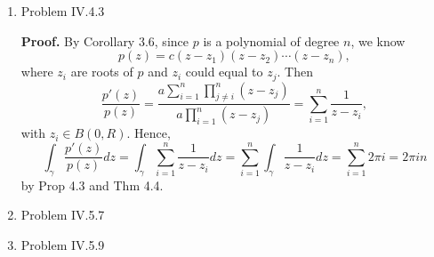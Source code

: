 \documentclass{article}%
\begin{document}
\begin{enumerate}
\item Problem IV.4.3

\textbf{Proof.} By Corollary 3.6, since $p$ is a polynomial of degree $n$, we know
$$
p(z) = c(z-z_1)(z-z_2)\cdots(z-z_n),
$$
where $z_i $ are roots of $p$ and $z_i $ could equal to $z_j $. Then
$$
\frac{p'(z)}{p(z)} = \frac{a\sum_{i=1}^{n}\prod_{j\ne i}^{n}(z-z_j)}{a\prod_{i=1}^{n}(z-z_j)} = \sum_{i=1}^{n}\frac{1}{z-z_i},
$$
with $z_i \in B(0, R) $.
Hence,
$$
\int_{\gamma}\frac{p'(z)}{p(z)}dz = \int_{\gamma}\sum_{i=1}^{n}\frac{1}{z-z_i}dz = \sum_{i=1}^{n}
\int_\gamma\frac{1}{z-z_i}dz = \sum_{i=1}^{n}2\pi i = 2\pi in
$$
by Prop 4.3 and Thm 4.4.

\item Problem IV.5.7



\item Problem IV.5.9


\end{enumerate}
\end{document}
